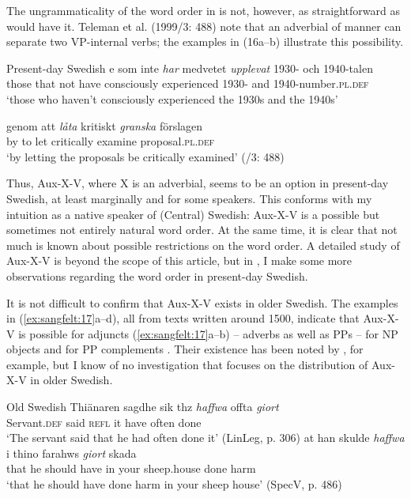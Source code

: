 \documentclass[output=paper, colorlinks, citecolor=brown]{langscibook}
\begin{document}
The ungrammaticality of the word order in  is not, however, as straightforward as \citet{Petzell2011} would have it. Teleman et al. (1999/3: 488) note that an adverbial of manner can separate two VP-internal verbs; the examples in (16a–b) illustrate this possibility.


\ea Present-day Swedish\label{ex:sangfelt:16}
\ea\label{ex:sangfelt:16a}
\gll [d]e som inte \textit{har} {medvetet} \textit{upplevat } 1930- och 1940-talen \\
 those that not have consciously experienced 1930- and 1940-number\textsc{.pl.def}\\
\glt ‘those who haven’t consciously experienced the 1930s and the 1940s’

\ex\label{ex:sangfelt:16b}
\gll genom att \textit{låta} {kritiskt} \textit{granska} förslagen \\
 by to let critically examine proposal.\textsc{pl.def}\\
 \glt ‘by letting the proposals be critically examined’ (\citealt{TelemanEtAl1999}/3: 488)\\
\z
\z

Thus, Aux-X-V, where X is an adverbial, seems to be an option in present-day Swedish, at least marginally and for some speakers. This conforms with my intuition as a native speaker of (Central) Swedish: Aux-X-V is a possible but sometimes not entirely natural word order. At the same time, it is clear that not much is known about possible restrictions on the word order. A detailed study of Aux-X-V is beyond the scope of this article, but in , I make some more observations regarding the word order in present-day Swedish.

It is not difficult to confirm that Aux-X-V exists in older Swedish. The examples in (\ref{ex:sangfelt:17}a–d), all from texts written around 1500, indicate that Aux-X-V is possible for adjuncts (\ref{ex:sangfelt:17}a–b) – adverbs as well as PPs – for NP objects  and for PP complements . Their existence has been noted by \citet[171--172]{Falk1993}, for example, but I know of no investigation that focuses on the distribution of Aux-X-V in older Swedish.


\ea Old Swedish\label{ex:sangfelt:17}
\ea\label{ex:sangfelt:17a}
\gll Thiänaren sagdhe sik thz \textit{haffwa} {offta} \textit{giort} \\
 Servant.\textsc{def} said \textsc{refl} it have often done\\
\glt ‘The servant said that he had often done it’ (LinLeg, p. 306)
\ex\label{ex:sangfelt:17b}
\gll at han skulde \textit{haffwa} i {thino} {farahws} \textit{giort} skada \\
 that he should have in your sheep.house done harm\\
\glt ‘that he should have done harm in your sheep house’ (SpecV, p. 486)
\end{document}
